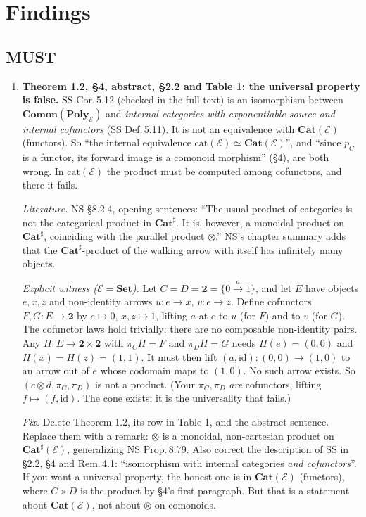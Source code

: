 \documentclass[11pt]{article}
\newcommand{\Poly}{\mathbf{Poly}}
\newcommand{\Cat}{\mathbf{Cat}}
\newcommand{\Set}{\mathbf{Set}}
\newcommand{\Comon}{\mathbf{Comon}}
\newcommand{\E}{\mathcal{E}}
\begin{document}
\section*{Findings}
\subsection*{MUST}
\begin{enumerate}[label=\textbf{M\arabic*.},leftmargin=*]
\item \textbf{Theorem 1.2, \S4, abstract, \S2.2 and Table 1: the universal property is false.}
  SS Cor.\,5.12 (checked in the full text) is an isomorphism between $\Comon(\Poly_\E)$ and
  \emph{internal categories with exponentiable source and internal cofunctors} (SS Def.\,5.11). It is
  not an equivalence with $\Cat(\E)$ (functors). So ``the internal equivalence
  $\mathrm{cat}(\E)\simeq\Cat(\E)$'', and ``since $p_C$ is a functor, its forward image is a
  comonoid morphism'' (\S4), are both wrong. In $\mathrm{cat}(\E)$ the product must be computed among
  cofunctors, and there it fails.

  \emph{Literature.} NS \S8.2.4, opening sentences: ``The usual product of categories
  is not the categorical product in $\Cat^\sharp$. It is, however, a monoidal product on
  $\Cat^\sharp$, coinciding with the parallel product $\otimes$.'' NS's chapter summary adds that the
  $\Cat^\sharp$-product of the walking arrow with itself has infinitely many objects.

  \emph{Explicit witness ($\E=\Set$).} Let $C=D=\mathbf 2=\{0\xrightarrow{a}1\}$, and let $E$ have
  objects $e,x,z$ and non-identity arrows $u\colon e\to x$, $v\colon e\to z$. Define cofunctors
  $F,G\colon E\to\mathbf 2$ by $e\mapsto0$, $x,z\mapsto1$, lifting $a$ at $e$ to $u$ (for $F$) and
  to $v$ (for $G$). The cofunctor laws hold trivially: there are no composable non-identity pairs.
  Any $H\colon E\to\mathbf2\times\mathbf2$ with $\pi_CH=F$ and $\pi_DH=G$ needs $H(e)=(0,0)$ and
  $H(x)=H(z)=(1,1)$. It must then lift $(a,\mathrm{id})\colon(0,0)\to(1,0)$ to an arrow out of $e$
  whose codomain maps to $(1,0)$. No such arrow exists. So $(c\otimes d,\pi_C,\pi_D)$ is not a product.
  (Your $\pi_C,\pi_D$ \emph{are} cofunctors, lifting $f\mapsto(f,\mathrm{id})$. The cone exists; it
  is the universality that fails.)

  \emph{Fix.} Delete Theorem 1.2, its row in Table 1, and the abstract sentence. Replace them with
  a remark: $\otimes$ is a monoidal, non-cartesian product on $\Cat^\sharp(\E)$, generalizing NS
  Prop.\,8.79. Also correct the description of SS in \S2.2, \S4 and Rem.\,4.1: ``isomorphism with
  internal categories \emph{and cofunctors}''. If you want a universal property, the honest one is
  in $\Cat(\E)$ (functors), where $C\times D$ is the product by \S4's first paragraph. But that is a
  statement about $\Cat(\E)$, not about $\otimes$ on comonoids.


\end{enumerate}
\end{document}
